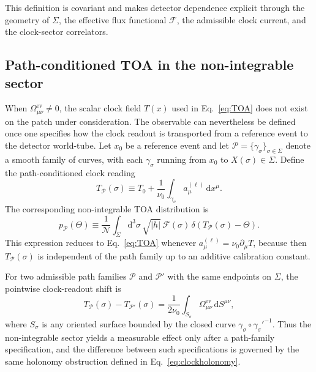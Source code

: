 \documentclass[pdflatex,sn-mathphys-num]{sn-jnl}
\theoremstyle{thmstylethree}
\theoremstyle{thmstyleone}
\theoremstyle{thmstyletwo}
\numberwithin{equation}{section}
\newcommand{\dd}{\mathrm{d}}
\newcommand{\Sig}{\Sigma}
\newcommand{\F}{\mathcal{F}}
\begin{document}
        This definition is covariant and makes detector dependence explicit through the geometry of $\Sig$, the effective flux functional $\F$, the admissible clock current, and the clock-sector correlators.

    \subsection{Path-conditioned TOA in the non-integrable sector}

        When $\Omega^{\mathrm{ev}}_{\mu\nu}\neq0$, the scalar clock field $T(x)$ used in Eq.~\eqref{eq:TOA} does not exist on the patch under consideration. The observable can nevertheless be defined once one specifies how the clock readout is transported from a reference event to the detector world-tube. Let $x_0$ be a reference event and let $\mathcal{P}=\{\gamma_\sigma\}_{\sigma\in\Sigma}$ denote a smooth family of curves, with each $\gamma_\sigma$ running from $x_0$ to $X(\sigma)\in\Sigma$. Define the path-conditioned clock reading
        \begin{equation}
            T_{\mathcal{P}}(\sigma)
            \equiv
            T_0+
            \frac{1}{\nu_0}
            \int_{\gamma_\sigma}
            a^{(\ell)}_\mu\,\dd x^\mu .
            \label{eq:pathClockOnDetector}
        \end{equation}
        The corresponding non-integrable TOA distribution is
        \begin{equation}
            p_{\mathcal{P}}(\Theta)
            \equiv
            \frac{1}{\mathcal{N}}
            \int_\Sigma \dd^3\sigma\,\sqrt{|h|}\,
            \F(\sigma)\,
            \delta\!\left(T_{\mathcal{P}}(\sigma)-\Theta\right).
            \label{eq:pathTOA}
        \end{equation}
        This expression reduces to Eq.~\eqref{eq:TOA} whenever $a^{(\ell)}_\mu=\nu_0\partial_\mu T$, because then $T_{\mathcal{P}}(\sigma)$ is independent of the path family up to an additive calibration constant.

        For two admissible path families $\mathcal{P}$ and $\mathcal{P}'$ with the same endpoints on $\Sigma$, the pointwise clock-readout shift is
        \begin{equation}
            T_{\mathcal{P}}(\sigma)-T_{\mathcal{P}'}(\sigma)
            =
            \frac{1}{2\nu_0}
            \int_{S_\sigma}
            \Omega^{\mathrm{ev}}_{\mu\nu}\,\dd S^{\mu\nu},
            \label{eq:pathFamilyShift}
        \end{equation}
        where $S_\sigma$ is any oriented surface bounded by the closed curve $\gamma_\sigma\circ\gamma_\sigma'^{-1}$. Thus the non-integrable sector yields a measurable effect only after a path-family specification, and the difference between such specifications is governed by the same holonomy obstruction defined in Eq.~\eqref{eq:clockholonomy}.
\end{document}
